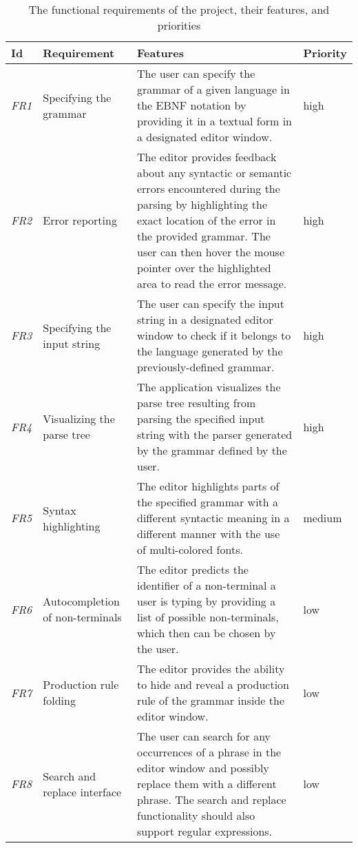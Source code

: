 \documentclass[english,engineering]{wizthesis}
\begin{document}
\begin{xltabular}{\textwidth}{@{}lL{3cm}Xl@{}}
  \caption{The functional requirements of the project, their features, and
  priorities}
  \label{tab:functional-requirements}\\
  \toprule
  Id & Requirement & Features & Priority \\* \midrule
  \endfirsthead
  \endhead
  \endfoot
  \endlastfoot
  \emph{FR1} & Specifying the grammar & The user can specify the grammar of a
  given language in the EBNF notation by providing it in a textual form in
  a designated editor window. & high \\
  \addlinespace[0.5em] \emph{FR2} & Error reporting & The editor provides
  feedback about any syntactic or semantic errors encountered during the
  parsing by highlighting the exact location of the error in the provided
  grammar. The user can then hover the mouse pointer over the highlighted area
  to read the error message. & high \\
  \addlinespace[0.5em] \emph{FR3} & Specifying the input string & The user can
  specify the input string in a designated editor window to check if it
  belongs to the language generated by the previously-defined grammar. & high
  \\
  \addlinespace[0.5em] \emph{FR4} & Visualizing the parse tree & The
  application visualizes the parse tree resulting from parsing the specified
  input string with the parser generated by the grammar defined by the user. &
  high \\
  \addlinespace[0.5em] \emph{FR5} & Syntax highlighting & The editor highlights
  parts of the specified grammar with a different syntactic meaning in a
  different manner with the use of multi-colored fonts. & medium \\
  \addlinespace[0.5em] \emph{FR6} & Autocompletion of non-terminals & The
  editor predicts the identifier of a non-terminal a user is typing by
  providing a list of possible non-terminals, which then can be chosen by the
  user. & low \\
  \addlinespace[0.5em] \emph{FR7} & Production rule folding & The editor
  provides the ability to hide and reveal a production rule of the grammar
  inside the editor window. & low \\
  \addlinespace[0.5em] \emph{FR8} & Search and replace interface & The user can
  search for any occurrences of a phrase in the editor window and possibly
  replace them with a different phrase. The search and replace functionality
  should also support regular expressions. & low \\* \bottomrule
\end{xltabular}
\end{document}
